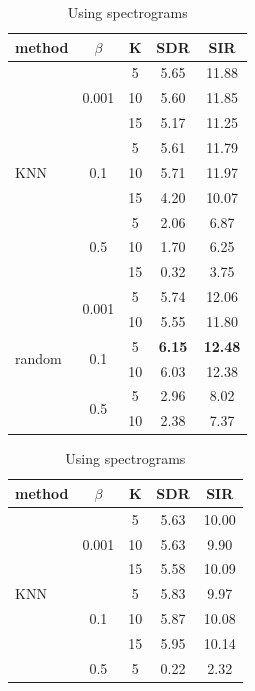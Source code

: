 \documentclass[master, tikz, final,11pt, dvipdfmx]{iscs-thesis}
\begin{document}
\begin{table}[h!]
\begin{subtable}{.5\linewidth}
\centering
\begin{tabular}{l|c|c|c|c}
method & $\beta$ & K & SDR & SIR \\ 
\hline
\multirow{9}{*}{KNN}  & \multirow{3}{*}{0.001} & 5 & 5.65 & 11.88 \\ 
\cline{3-5}
 &  & 10 & 5.60 & 11.85 \\
\cline{3-5}
 &  & 15 & 5.17 & 11.25 \\
\cline{2-5}
 & \multirow{3}{*}{0.1} & 5 & 5.61 & 11.79 \\
\cline{3-5}
 &  & 10 & 5.71 & 11.97 \\
\cline{3-5}
 &  & 15 & 4.20 & 10.07 \\
\cline{2-5}
 & \multirow{3}{*}{0.5} & 5 & 2.06 & 6.87 \\
\cline{3-5}
 &  & 10 & 1.70 & 6.25 \\
\cline{3-5}
 &  & 15 & 0.32 & 3.75 \\
\hline
\multirow{9}{*}{random}  & \multirow{2}{*}{0.001} & 5 & 5.74 & 12.06 \\ 
\cline{3-5}
 &  & 10 & 5.55 & 11.80 \\
\cline{2-5}
 & \multirow{2}{*}{0.1} & 5 & \textbf{6.15} & \textbf{12.48} \\
\cline{3-5}
 &  & 10 & 6.03 & 12.38 \\
\cline{2-5}
 & \multirow{2}{*}{0.5} & 5 & 2.96 & 8.02 \\
\cline{3-5}
 &  & 10 & 2.38 & 7.37 \\
\hline
\end{tabular}
\caption{Using spectrograms}
\label{table:SCE100NS}
\end{subtable}%
\begin{subtable}{.5\linewidth}
\centering
\begin{tabular}{l|c|c|c|c}
method & $\beta$ & K & SDR & SIR \\ 
\hline
\multirow{9}{*}{KNN}  & \multirow{3}{*}{0.001} & 5 & 5.63 & 10.00 \\ 
\cline{3-5}
 &  & 10 & 5.63 & 9.90 \\
\cline{3-5}
 &  & 15 & 5.58 & 10.09 \\
\cline{2-5}
 & \multirow{3}{*}{0.1} & 5 & 5.83 & 9.97 \\
\cline{3-5}
 &  & 10 & 5.87 & 10.08 \\
\cline{3-5}
 &  & 15 & 5.95 & 10.14 \\
\cline{2-5}
 & \multirow{3}{*}{0.5} & 5 & 0.22 & 2.32 \\

\end{tabular}
\end{subtable}
\end{table}
\end{document}
